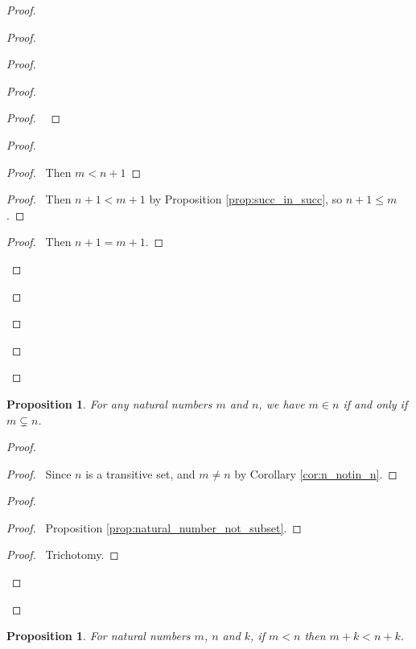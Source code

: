 \documentclass{report}
\let\qed\relax
\newtheorem{prop}[ax]{Proposition}
\theoremstyle{definition}
\begin{document}
\begin{proof}
\begin{proof}
\begin{proof}
\begin{proof}
\begin{proof}
				\pf\ 
			\end{proof}
			\begin{proof}
				\begin{proof}
					\pf\ Then $m < n+1$
				\end{proof}
				\begin{proof}
					\pf\ Then $n+1 < m+1$ by Proposition \ref{prop:succ_in_succ}, so $n+1 \leq m$.
				\end{proof}
				\begin{proof}
					\pf\ Then $n+1 = m+1$.
				\end{proof}
			\end{proof}
		\end{proof}
	\end{proof}
\end{proof}
\qed
\end{proof}

\begin{prop}
For any natural numbers $m$ and $n$, we have $m \in n$ if and only if $m \subsetneq n$.
\end{prop}

\begin{proof}
\pf
{}
\begin{proof}
	\pf\ Since $n$ is a transitive set, and $m \neq n$ by Corollary \ref{cor:n_notin_n}.
\end{proof}
\begin{proof}
	\begin{proof}
		\pf\ Proposition \ref{prop:natural_number_not_subset}.
	\end{proof}
	\begin{proof}
		\pf\ Trichotomy.
	\end{proof}
\end{proof}
\qed
\end{proof}

\begin{prop}
\label{prop:plus_mono}
For natural numbers $m$, $n$ and $k$, if $m < n$ then $m + k < n + k$.
\end{prop}
\end{document}
